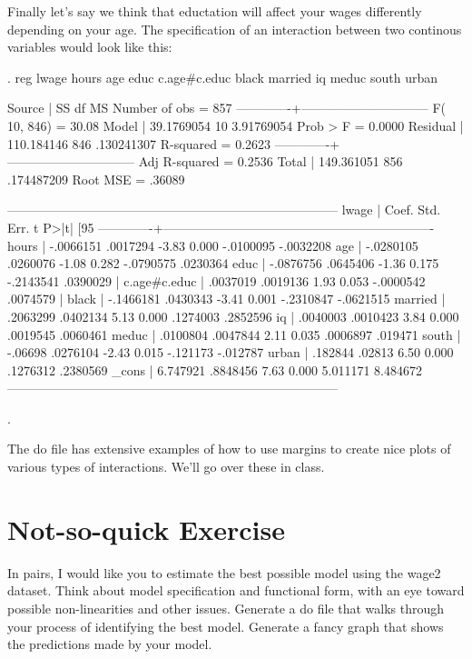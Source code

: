 \documentclass[12pt]{article}
\begin{document}
Finally let's say we think that eductation will affect your wages
differently depending on your age. The specification of an interaction
between two continous variables would look like this: 


\begin{stlog}
  
. reg lwage hours age educ c.age#c.educ black married iq meduc south urban 

      Source |       SS       df       MS              Number of obs =     857
-------------+------------------------------           F( 10,   846) =   30.08
       Model |  39.1769054    10  3.91769054           Prob > F      =  0.0000
    Residual |  110.184146   846  .130241307           R-squared     =  0.2623
-------------+------------------------------           Adj R-squared =  0.2536
       Total |  149.361051   856  .174487209           Root MSE      =  .36089

------------------------------------------------------------------------------
       lwage |      Coef.   Std. Err.      t    P>|t|     [95%
-------------+----------------------------------------------------------------
       hours |  -.0066151   .0017294    -3.83   0.000    -.0100095   -.0032208
         age |  -.0280105   .0260076    -1.08   0.282    -.0790575    .0230364
        educ |  -.0876756   .0645406    -1.36   0.175    -.2143541    .0390029
             |
c.age#c.educ |   .0037019   .0019136     1.93   0.053    -.0000542    .0074579
             |
       black |  -.1466181   .0430343    -3.41   0.001    -.2310847   -.0621515
     married |   .2063299   .0402134     5.13   0.000     .1274003    .2852596
          iq |   .0040003   .0010423     3.84   0.000     .0019545    .0060461
       meduc |   .0100804   .0047844     2.11   0.035     .0006897     .019471
       south |    -.06698   .0276104    -2.43   0.015     -.121173    -.012787
       urban |    .182844     .02813     6.50   0.000     .1276312    .2380569
       _cons |   6.747921   .8848456     7.63   0.000     5.011171    8.484672
------------------------------------------------------------------------------

. 
\end{stlog}

The do file has extensive examples of how to use margins to create
nice plots of various types of interactions. We'll go over these in class.

\section{Not-so-quick Exercise}
\label{sec:not-so-quick}

In pairs, I would like you to estimate the best possible model using
the wage2 dataset. Think about model specification and functional
form, with an eye toward possible non-linearities and other
issues. Generate a do file that walks through your process of
identifying the best model.  Generate a fancy graph that shows the
predictions made by your model. 
\end{document}
